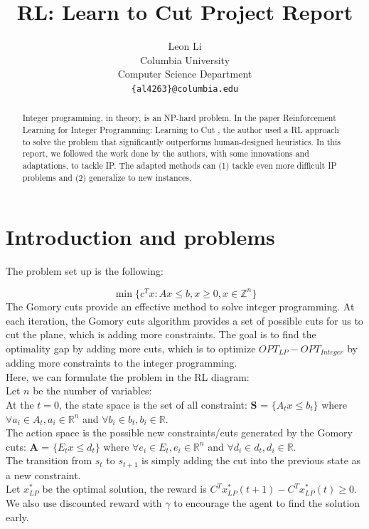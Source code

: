 \documentclass{article}
\title{RL: Learn to Cut Project Report
}
\author{
  Leon Li \\
  Columbia University \\
  Computer Science Department\\
  \texttt{\{al4263\}@columbia.edu} \\
}
\begin{document}
\maketitle


\begin{abstract}
Integer programming, in theory, is an NP-hard problem. In the paper Reinforcement Learning for Integer Programming: Learning to Cut \cite{rlcut}, the author used a RL approach to solve the problem that significantly outperforms human-designed heuristics. In this report, we followed the work done by the authors, with some innovations and adaptations, to tackle IP. The adapted methods can (1) tackle even more difficult IP problems and (2) generalize to new instances.
\end{abstract}





\section{Introduction and problems}
The problem set up is the following:

\[  \min \{c^Tx : Ax \leq b,x\geq0, x\in \mathbb{Z}^n \} \]
The Gomory cuts provide an effective method to solve integer programming. At each iteration, the Gomory cuts algorithm provides a set of possible cuts for us to cut the plane, which is adding more constraints. The goal is to find the optimality gap by adding more cuts, which is to optimize $OPT_{LP} - OPT_{Integer}$ \cite{lecture} by adding more constraints to the integer programming.\\
Here, we can formulate the problem in the RL diagram: \\ 
Let $n$ be the number of variables:\\ 
At the $t = 0$, the state space is the set of all constraint: \textbf{S} = $\{A_t x \leq b_t \}$ where $\forall a_i \in A_t, a_i \in \mathbb{R}^n$ and  $\forall b_i \in b_t, b_i \in \mathbb{R}$.\\ 
The action space is the possible new constraints/cuts generated by the Gomory cuts: \textbf{A} =  $\{E_t x \leq d_t \}$ where $\forall e_i \in E_t, e_i \in \mathbb{R}^n$ and  $\forall d_i \in d_t, d_i \in \mathbb{R}$.\\ 
The transition from $s_t$ to $s_{t+1}$ is simply adding the cut into the previous state as a new constraint.\\  
Let $x^*_{LP}$ be the optimal solution, the reward is $C^T x^*_{LP}(t+1) - C^T x^*_{LP}(t) \geq 0.$ We also use discounted reward with $\gamma$ to encourage the agent to find the solution early.
\end{document}
